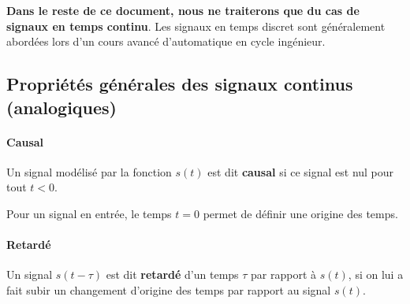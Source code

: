 \textbf{Dans le reste de ce document, nous ne traiterons que
du cas de signaux en temps continu}. Les signaux en temps discret
sont généralement abordées lors d'un cours 
avancé d'automatique en cycle ingénieur.

\subsection{Propriétés générales des signaux continus (analogiques)}

\paragraph{Causal}

Un signal modélisé par la fonction $s(t)$ est dit \textbf{causal}
si ce signal est nul pour tout $t<0$. 
{
\begin{figure}[htb]
\centering
{}

\end{figure}
\setlength\intextsep{0pt}
}
Pour un signal en entrée, le temps $t=0$ permet de 
définir une origine des temps.

\paragraph{Retardé}
Un signal $s(t-\tau)$ est dit \textbf{retardé} d'un temps $\tau$ 
par rapport à $s(t)$, si on lui a fait subir un changement
d'origine des temps par rapport au signal $s(t)$.
\begin{center}

\end{center}

